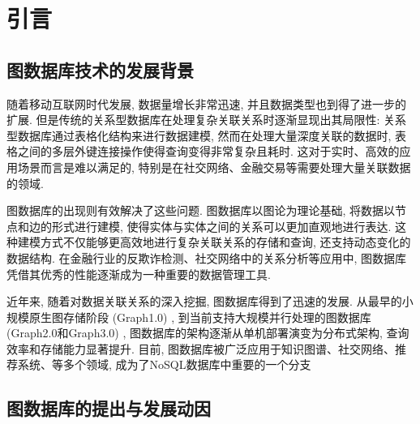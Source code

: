\section{引言}

\subsection{图数据库技术的发展背景}

随着移动互联网时代发展, 数据量增长非常迅速, 并且数据类型也到得了进一步的扩展. 但是传统的关系型数据库在处理复杂关联关系时逐渐显现出其局限性: 关系型数据库通过表格化结构来进行数据建模, 然而在处理大量深度关联的数据时, 表格之间的多层外键连接操作使得查询变得非常复杂且耗时. 这对于实时、高效的应用场景而言是难以满足的, 特别是在社交网络、金融交易等需要处理大量关联数据的领域.

图数据库的出现则有效解决了这些问题. 图数据库以图论为理论基础, 将数据以节点和边的形式进行建模, 使得实体与实体之间的关系可以更加直观地进行表达. 这种建模方式不仅能够更高效地进行复杂关联关系的存储和查询, 还支持动态变化的数据结构. 在金融行业的反欺诈检测、社交网络中的关系分析等应用中, 图数据库凭借其优秀的性能逐渐成为一种重要的数据管理工具.

近年来, 随着对数据关联关系的深入挖掘, 图数据库得到了迅速的发展. 从最早的小规模原生图存储阶段 (Graph1.0) , 到当前支持大规模并行处理的图数据库 (Graph2.0和Graph3.0) , 图数据库的架构逐渐从单机部署演变为分布式架构, 查询效率和存储能力显著提升. 目前, 图数据库被广泛应用于知识图谱、社交网络、推荐系统、等多个领域, 成为了NoSQL数据库中重要的一个分支


\subsection{图数据库的提出与发展动因}

